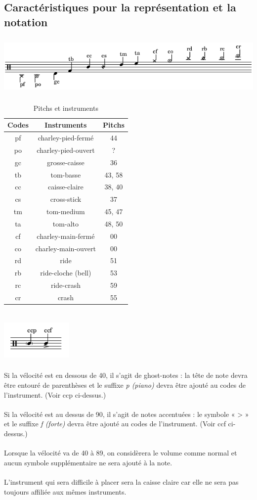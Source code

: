 \subsection{Caractéristiques pour la représentation et la notation}
\includegraphics[height=30mm, width=155mm]{z_images/notation/description_notation.png}
\begin{table}[h]
	\centering
	\begin{tabular}{|c|c|c|} \hline
		Codes & Instruments & Pitchs \\ \hline
		pf & charley-pied-fermé & 44 \\
		po & charley-pied-ouvert & ? \\
		gc & grosse-caisse & 36 \\
		tb & tom-basse & 43, 58 \\
		cc & caisse-claire & 38, 40 \\
		cs & cross-stick & 37 \\
		tm & tom-medium & 45, 47 \\
		ta & tom-alto & 48, 50 \\
		cf & charley-main-fermé & 00 \\
		co & charley-main-ouvert & 00 \\
		rd & ride & 51 \\
		rb & ride-cloche (bell) & 53 \\
		rc & ride-crash & 59 \\
		cr & crash & 55 \\ \hline
	\end{tabular}
	\caption{Pitchs et instruments}
\end{table}\\
\includegraphics[height=20mm, width=35mm]{z_images/notation/description_nuances.png}\\\\
Si la vélocité est en dessous de 40, il s’agit de ghost-notes : la tête de note devra être entouré de parenthèses et le suffixe \textit{p (piano)} devra être ajouté au codes de l’instrument. (Voir ccp ci-dessus.)\\\\
Si la vélocité est au dessus de 90, il s’agit de notes accentuées : le symbole « > » et le suffixe \textit{f (forte)} devra être ajouté au codes de l’instrument. (Voir ccf ci-dessus.)\\\\
Lorsque la vélocité va de 40 à 89, on considèrera le volume comme normal et aucun symbole supplémentaire ne sera ajouté à la note.\\\\
L’instrument qui sera difficile à placer sera la caisse claire car elle ne sera pas toujours affiliée aux mêmes instruments.
